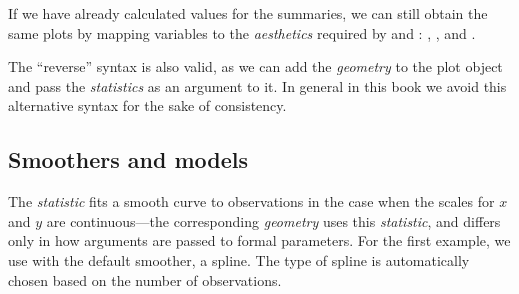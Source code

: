 \documentclass[krantz2]{krantz}\usepackage{knitr}
\begin{document}
If we have already calculated values for the summaries, we can still obtain the same plots by mapping variables to the \emph{aesthetics} required by  and : , ,  and .

\begin{explainbox}
The ``reverse'' syntax is also valid, as we can add the \emph{geometry} to the plot object and pass the \emph{statistics} as an argument to it. In general in this book we avoid this alternative syntax for the sake of consistency.

\begin{knitrout}\footnotesize
{}\color{fgcolor}\begin{kframe}
\begin{alltt}
  \hlopt{+}
  \hlstd{(} \hlstd{=} \hlstd{,}  
\end{alltt}
\end{kframe}
\end{knitrout}
\end{explainbox}

\subsection{Smoothers and models}
The \emph{statistic}  fits a smooth curve to observations in the case when the scales for $x$ and $y$ are continuous---the corresponding \emph{geometry}  uses this \emph{statistic}, and differs only in how arguments are passed to formal parameters. For the first example, we use  with the default smoother, a spline. The type of spline is automatically chosen based on the number of observations.

\begin{knitrout}\footnotesize
{}\color{fgcolor}\begin{kframe}
\begin{alltt}
\hlstd{(}  \hlstd{(}    \hlopt{+}
       \hlstd{()}
\end{alltt}
\end{kframe}
\end{knitrout}
\end{document}
